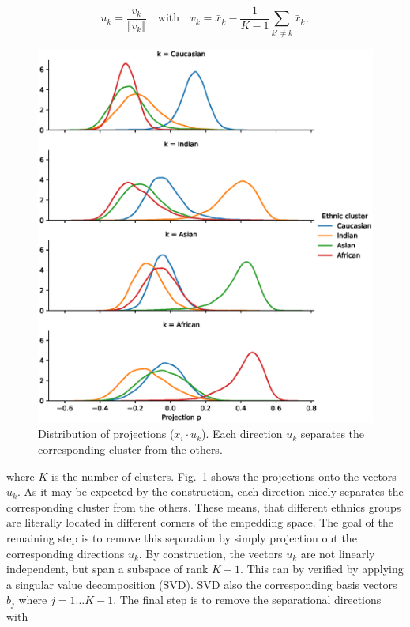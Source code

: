 \documentclass[12pt]{article}
\begin{document}
\begin{equation}
\label{eq:uk}
	u_k = \frac{v_k}{\Vert v_k \Vert} \quad \textrm{with} \quad v_k = \bar{x}_k -  \frac{1}{K-1}\sum_{k' \ne k} \bar{x}_k,
\end{equation} 

\begin{figure}
  \includegraphics[width=\linewidth]{projection.eps}
  \caption{Distribution of projections  ($x_i\cdot u_k$). Each direction $u_k$ separates the corresponding cluster from the others.}
  \label{fig:projection}
\end{figure}

\noindent where $K$ is the number of clusters. Fig.~\ref{fig:projection} shows the projections onto the vectors $u_k$. As it may be expected by the construction, each direction nicely separates the corresponding cluster from the others. These means, that different ethnics groups are literally located in different corners of the empedding space. The goal of the remaining step is to remove this separation by simply projection out the corresponding directions $u_k$. By construction, the vectors $u_k$ are not linearly independent, but span a subspace of rank $K-1$. This can by verified by applying a singular value decomposition (SVD).  SVD also the corresponding basis vectors $b_j$ where $j=1\ldots K-1$. The final step is to remove the separational directions with
\end{document}
